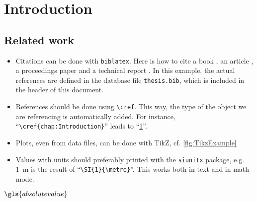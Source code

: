 \chapter{Introduction}
\label{chap:Introduction}




\section{Related work}
\begin{itemize}
\item Citations can be done with \texttt{biblatex}. Here is how to cite a book \cite{GoWo07}, an article \cite{Ar66}, a proceedings paper \cite{Ch05} and a technical report \cite{ChEsNi04}. In this example, the actual references are defined in the database file \texttt{thesis.bib}, which is included in the header of this document.
\item References should be done using \texttt{\textbackslash cref}. This way, the type of the object we are referencing is automatically added. For instance, \enquote{\texttt{\textbackslash cref\{chap:Introduction\}}} leads to \enquote{\cref{chap:Introduction}}.
\item Plots, even from data files, can be done with TikZ, cf. \cref{fig:TikzExample}
\item Values with units should preferably printed with the \texttt{siunitx} package, e.g. \SI{1}{\metre} is the result of \enquote{\texttt{\textbackslash SI\{1\}\{\textbackslash metre\}}}. This works both in text and in math mode.
\end{itemize}
$\gls{absolute value}$
